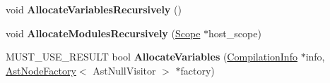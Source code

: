 \begin{DoxyCompactItemize}
\item 
\hypertarget{classv8_1_1internal_1_1_scope_a5658e6c37363a9ef878f887b134fdec5}{}void {\bfseries Allocate\+Variables\+Recursively} ()\label{classv8_1_1internal_1_1_scope_a5658e6c37363a9ef878f887b134fdec5}

\item 
\hypertarget{classv8_1_1internal_1_1_scope_a96de2eefb5713f13d806152d9f0f48ff}{}void {\bfseries Allocate\+Modules\+Recursively} (\hyperlink{classv8_1_1internal_1_1_scope}{Scope} $\ast$host\+\_\+scope)\label{classv8_1_1internal_1_1_scope_a96de2eefb5713f13d806152d9f0f48ff}

\item 
\hypertarget{classv8_1_1internal_1_1_scope_a200e0933c8ef7917ef8e2a2ba8bc1d34}{}M\+U\+S\+T\+\_\+\+U\+S\+E\+\_\+\+R\+E\+S\+U\+L\+T bool {\bfseries Allocate\+Variables} (\hyperlink{classv8_1_1internal_1_1_compilation_info}{Compilation\+Info} $\ast$info, \hyperlink{classv8_1_1internal_1_1_ast_node_factory}{Ast\+Node\+Factory}$<$ Ast\+Null\+Visitor $>$ $\ast$factory)\label{classv8_1_1internal_1_1_scope_a200e0933c8ef7917ef8e2a2ba8bc1d34}

\end{DoxyCompactItemize}
